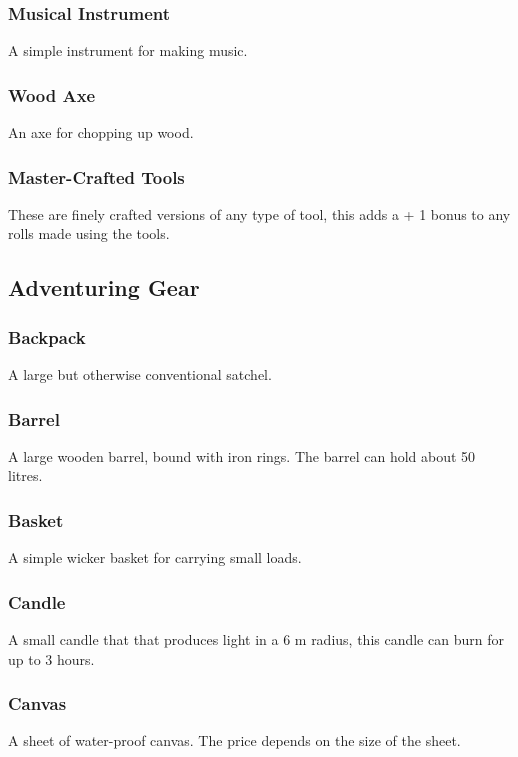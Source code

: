 \documentclass[a4paper,11pt,oneside]{book}
\newcommand{\textlf}[1]{\textbf{\titlecap{#1}}}
\begin{document}
\subsubsection*{Musical Instrument}
A simple instrument for making music.

\subsubsection*{Wood Axe}
An axe for chopping up wood.

\subsubsection*{Master-Crafted Tools}
These are finely crafted versions of any type of tool, this adds a + 1 bonus to any rolls made using the tools.

\subsection{Adventuring Gear}

\subsubsection*{Backpack}
A large but otherwise conventional satchel.

\subsubsection*{Barrel}
A large wooden barrel, bound with iron rings. The barrel can hold about 50 litres.

\subsubsection*{Basket}
A simple wicker basket for carrying small loads.

\subsubsection*{Candle}
A small candle that that produces \textlf{low} light in a 6 m radius, this candle can burn for up to 3 hours.

\subsubsection*{Canvas}
A sheet of water-proof canvas. The price depends on the size of the sheet.
\end{document}
